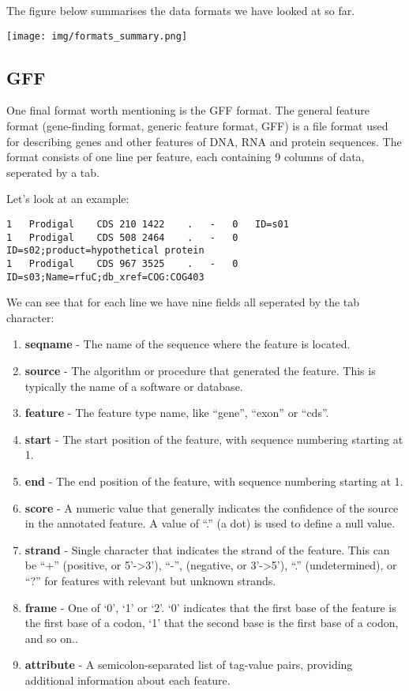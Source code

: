 \documentclass[11pt]{article}
\providecommand{\tightlist}{%
      \setlength{\itemsep}{0pt}\setlength{\parskip}{0pt}}
\begin{document}
The figure below summarises the data formats we have looked at so far.


\begin{center}
\texttt{[image: img/formats\_summary.png]}
\end{center}


    \hypertarget{gff}{%
\subsection{GFF}\label{gff}}

One final format worth mentioning is the GFF format. The general feature
format (gene-finding format, generic feature format, GFF) is a file
format used for describing genes and other features of DNA, RNA and
protein sequences. The format consists of one line per feature, each
containing 9 columns of data, seperated by a tab.

Let's look at an example:

\begin{verbatim}
1   Prodigal    CDS 210 1422    .   -   0   ID=s01
1   Prodigal    CDS 508 2464    .   -   0   ID=s02;product=hypothetical protein
1   Prodigal    CDS 967 3525    .   -   0   ID=s03;Name=rfuC;db_xref=COG:COG403
\end{verbatim}

We can see that for each line we have nine fields all seperated by the
tab character:

\begin{enumerate}
\def\labelenumi{\arabic{enumi}.}
\tightlist
\item
  \textbf{seqname} - The name of the sequence where the feature is
  located.
\item
  \textbf{source} - The algorithm or procedure that generated the
  feature. This is typically the name of a software or database.
\item
  \textbf{feature} - The feature type name, like ``gene'', ``exon'' or
  ``cds''.
\item
  \textbf{start} - The start position of the feature, with sequence
  numbering starting at 1.
\item
  \textbf{end} - The end position of the feature, with sequence
  numbering starting at 1.
\item
  \textbf{score} - A numeric value that generally indicates the
  confidence of the source in the annotated feature. A value of ``.'' (a
  dot) is used to define a null value.
\item
  \textbf{strand} - Single character that indicates the strand of the
  feature. This can be ``+'' (positive, or 5'-\textgreater3'), ``-'',
  (negative, or 3'-\textgreater5'), ``.'' (undetermined), or ``?'' for
  features with relevant but unknown strands.
\item
  \textbf{frame} - One of `0', `1' or `2'. `0' indicates that the first
  base of the feature is the first base of a codon, `1' that the second
  base is the first base of a codon, and so on..
\item
  \textbf{attribute} - A semicolon-separated list of tag-value pairs,
  providing additional information about each feature.
\end{enumerate}
\end{document}
